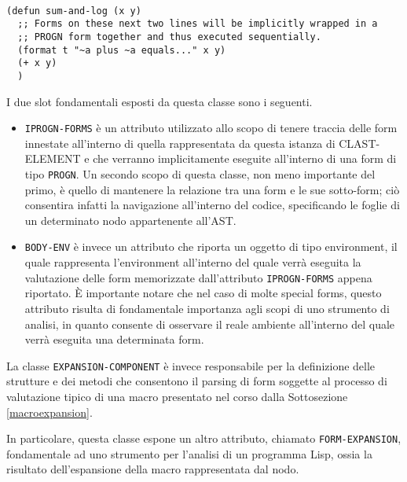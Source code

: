\begin{lstlisting}[caption=Esempio di costrutto che fa utilizzo di del
costrutto PROGN in modo implicito]

(defun sum-and-log (x y)
  ;; Forms on these next two lines will be implicitly wrapped in a
  ;; PROGN form together and thus executed sequentially.
  (format t "~a plus ~a equals..." x y)
  (+ x y)
  )

\end{lstlisting}

I due slot fondamentali esposti da questa classe sono i seguenti.\\

\begin{itemize}

\item \texttt{IPROGN-FORMS} è un attributo utilizzato allo scopo di tenere
traccia delle form innestate all’interno di quella rappresentata da questa
istanza di CLAST-ELEMENT e che verranno implicitamente eseguite all’interno di
una form di tipo \texttt{PROGN}. Un secondo scopo di questa classe, non meno
importante del primo, è quello di mantenere la relazione tra una form e le sue
sotto-form; ciò consentira infatti la navigazione all'interno del codice,
specificando le foglie di un determinato nodo appartenente all'AST.

\item \texttt{BODY-ENV} è invece un attributo che riporta un oggetto di tipo
environment, il quale rappresenta l’environment all’interno del quale verrà
eseguita la valutazione delle form memorizzate dall’attributo \texttt
{IPROGN-FORMS} appena riportato. È importante notare che nel caso di molte
special forms, questo attributo risulta di fondamentale importanza agli scopi di
uno strumento di analisi, in quanto consente di osservare il reale ambiente
all'interno del quale verrà eseguita una determinata form.

\end{itemize}

La classe \texttt{EXPANSION-COMPONENT} è invece responsabile per la
definizione delle strutture e dei metodi che consentono il parsing di form
soggette al processo di valutazione tipico di una macro presentato nel corso
dalla Sottosezione \ref{macroexpansion}.

In particolare, questa classe espone un altro attributo, chiamato \texttt
{FORM-EXPANSION}, fondamentale ad uno strumento per l’analisi di un programma
Lisp, ossia la risultato dell’espansione della macro rappresentata dal nodo.\\

